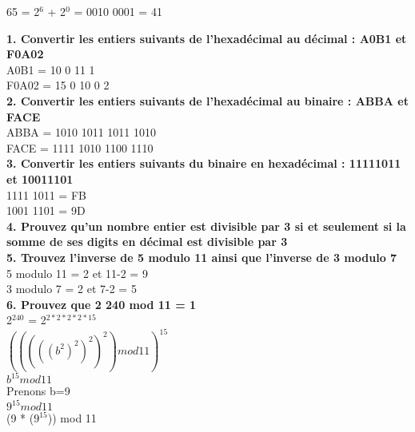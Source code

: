 65 = 2$^{6}$ + 2$^{0}$ = 0010 0001 = 41 \\

\newpage

\textbf{1. Convertir les entiers suivants de l’hexadécimal au décimal : A0B1 et F0A02} \\

A0B1 = 10 0 11 1 \\

F0A02 = 15 0 10 0 2 \\

\textbf{2. Convertir les entiers suivants de l’hexadécimal au binaire : ABBA et FACE} \\

ABBA = 1010 1011 1011 1010 \\

FACE = 1111 1010 1100 1110 \\

\textbf{3. Convertir les entiers suivants du binaire en hexadécimal : 11111011 et 10011101} \\

1111 1011 = FB \\

1001 1101 = 9D \\

\textbf{4. Prouvez qu’un nombre entier est divisible par 3 si et seulement si la somme de ses digits en décimal est divisible par 3} \\


\textbf{5. Trouvez l’inverse de 5 modulo 11 ainsi que l’inverse de 3 modulo 7} \\

5 modulo 11 = 2 et 11-2 = 9 \\

3 modulo 7 = 2 et 7-2 = 5 \\

\newpage
\textbf{6. Prouvez que 2 240 mod 11 = 1} \\

2$^{240}$ = 2$^{2*2*2*2*15}$ \\

$(((((b^{2})^{2})^{2})^{2}) mod 11)^{15}$ \\

$b^{15} mod 11$ \\

Prenons b=9 \\

$9^{15} mod 11$ \\

(9 * ($9^{15}$)) mod 11 \\

